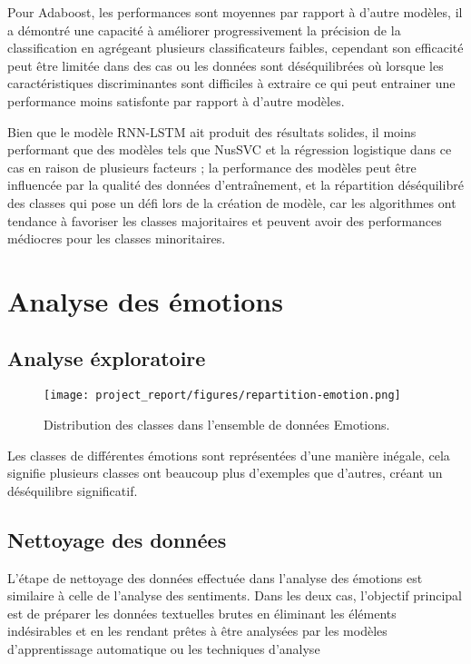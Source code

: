 Pour Adaboost, les performances sont moyennes par rapport à d’autre modèles, il a démontré une capacité à améliorer progressivement la précision de la classification en agrégeant plusieurs classificateurs faibles, cependant son efficacité peut être limitée dans des cas ou les données sont déséquilibrées où lorsque les caractéristiques discriminantes sont difficiles à extraire ce qui peut entrainer une performance moins satisfonte par rapport à d’autre modèles.\par


Bien que le modèle RNN-LSTM ait produit des résultats solides, il moins performant que des modèles tels que NusSVC et la régression logistique dans ce cas en raison de plusieurs facteurs ; la performance des modèles peut être influencée par la qualité des données d'entraînement, et la répartition déséquilibré des classes qui pose un défi lors de la création de modèle, car les algorithmes ont tendance à favoriser les classes majoritaires et peuvent avoir des performances médiocres pour les classes minoritaires.   





\section{Analyse des émotions}
\subsection{Analyse éxploratoire}

\begin{figure}[h]
    \centering
    \texttt{[image: project\_report/figures/repartition-emotion.png]}
    \caption{Distribution des classes dans l'ensemble de données Emotions.}
    \label{fig:figDescri}
\end{figure}

Les classes de différentes émotions sont représentées d’une manière inégale, cela signifie plusieurs classes ont beaucoup plus d’exemples que d’autres, créant un déséquilibre significatif. 

\subsection{Nettoyage des données} 
L'étape de nettoyage des données effectuée dans l'analyse des émotions est similaire à celle de l'analyse des sentiments. Dans les deux cas, l'objectif principal est de préparer les données textuelles brutes en éliminant les éléments indésirables et en les rendant prêtes à être analysées par les modèles d'apprentissage automatique ou les techniques d'analyse



